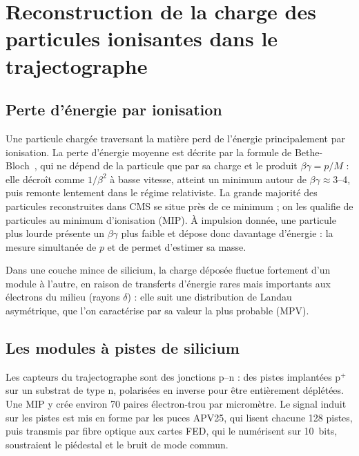 \section[Reconstruction de la charge des particules ionisantes]{Reconstruction de la charge des particules ionisantes dans le trajectographe}
\label{sec:resume:saturation}

\subsection{Perte d'énergie par ionisation}

Une particule chargée traversant la matière perd de l'énergie principalement par ionisation. La perte d'énergie moyenne est décrite par la formule de Bethe-Bloch~\cite{PDG}, qui ne dépend de la particule que par sa charge et le produit $\beta\gamma=p/M$ : elle décroît comme $1/\beta^2$ à basse vitesse, atteint un minimum autour de $\beta\gamma\approx3$--4, puis remonte lentement dans le régime relativiste. La grande majorité des particules reconstruites dans CMS se situe près de ce minimum ; on les qualifie de particules au minimum d'ionisation (MIP). À impulsion donnée, une particule plus lourde présente un $\beta\gamma$ plus faible et dépose donc davantage d'énergie : la mesure simultanée de $p$ et de \dedx{} permet d'estimer sa masse.

Dans une couche mince de silicium, la charge déposée fluctue fortement d'un module à l'autre, en raison de transferts d'énergie rares mais importants aux électrons du milieu (rayons $\delta$) : elle suit une distribution de Landau~\cite{Landau} asymétrique, que l'on caractérise par sa valeur la plus probable (MPV).

\subsection{Les modules à pistes de silicium}

Les capteurs du trajectographe sont des jonctions p--n : des pistes implantées p$^+$ sur un substrat de type n, polarisées en inverse pour être entièrement déplétées. Une MIP y crée environ 70 paires électron-trou par micromètre. Le signal induit sur les pistes est mis en forme par les puces APV25, qui lisent chacune 128 pistes, puis transmis par fibre optique aux cartes FED, qui le numérisent sur 10~bits, soustraient le piédestal et le bruit de mode commun.

